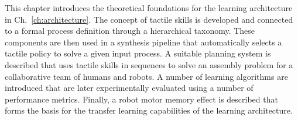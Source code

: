 This chapter introduces the theoretical foundations for the learning architecture in Ch.~\ref{ch:architecture}.
The concept of tactile skills is developed and connected to a formal process definition through a hierarchical taxonomy.
These components are then used in a synthesis pipeline that automatically selects a tactile policy to solve a given input process.
A suitable planning system is described that uses tactile skills in sequences to solve an assembly problem for a collaborative team of humans and robots.
A number of learning algorithms are introduced that are later experimentally evaluated using a number of performance metrics.
Finally, a robot motor memory effect is described that forms the basis for the transfer learning capabilities of the learning architecture.